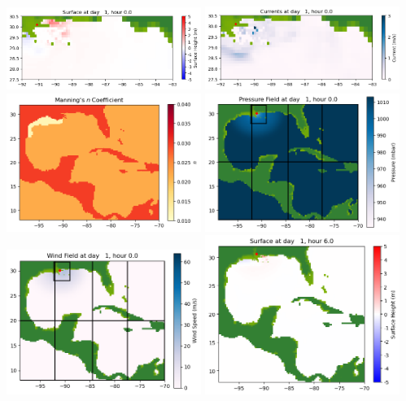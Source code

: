\documentclass[11pt]{article}
\begin{document}
\vskip 10pt 
\includegraphics[width=0.475\textwidth]{frame0012fig1003.png}
\includegraphics[width=0.475\textwidth]{frame0012fig1004.png}
\vskip 10pt 
\includegraphics[width=0.475\textwidth]{frame0012fig1005.png}
\includegraphics[width=0.475\textwidth]{frame0012fig1006.png}
\vskip 10pt 
\includegraphics[width=0.475\textwidth]{frame0012fig1007.png}
\vskip 10pt 
\includegraphics[width=0.475\textwidth]{frame0013fig1001.png}
\end{document}
